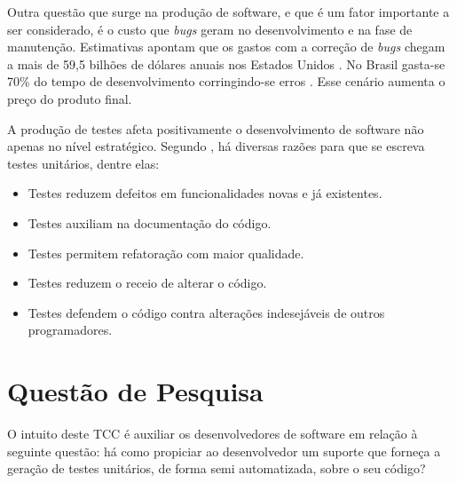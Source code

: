   \par
  \indent Outra questão que surge na produção de software, e que é um fator importante a ser considerado, é o custo que \textit{bugs} geram no desenvolvimento e na fase de manutenção. Estimativas apontam que os gastos com a correção de \textit{bugs} chegam a mais de 59,5 bilhões de dólares anuais nos Estados Unidos \cite{jantti2008}. No Brasil gasta-se 70\% do tempo de desenvolvimento corringindo-se erros \cite{janones2010}. Esse cenário aumenta o preço do produto final.
  \par
  \indent A produção de testes afeta positivamente o desenvolvimento de software não apenas no nível estratégico. Segundo , há diversas razões para que se escreva testes unitários, dentre elas:
  \begin{itemize}
    \item Testes reduzem defeitos em funcionalidades novas e já existentes.
    \item Testes auxiliam na documentação do código.
    \item Testes permitem refatoração com maior qualidade.
    \item Testes reduzem o receio de alterar o código.
    \item Testes defendem o código contra alterações indesejáveis de outros programadores.
  \end{itemize}

 \section{Questão de Pesquisa}
O intuito deste TCC é auxiliar os desenvolvedores de software em relação à seguinte questão: há como propiciar ao desenvolvedor um suporte que forneça a geração de testes unitários, de forma semi automatizada, sobre o seu código?


